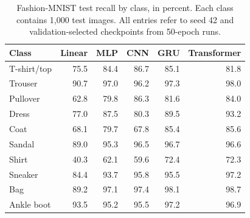 \begin{table}[htbp]
\centering\small
\caption{Fashion-MNIST test recall by class, in percent. Each class contains
1,000 test images. All entries refer to seed 42 and validation-selected checkpoints
from 50-epoch runs.}
\label{tab:class-recall}
\begin{tabular}{lrrrrr}
\toprule
Class & Linear & MLP & CNN & GRU & Transformer\\\midrule
T-shirt/top & 75.5 & 84.4 & 86.7 & 85.1 & 81.8\\
Trouser & 90.7 & 97.0 & 96.2 & 97.3 & 98.0\\
Pullover & 62.8 & 79.8 & 86.3 & 81.6 & 84.0\\
Dress & 77.0 & 87.5 & 80.3 & 89.5 & 93.2\\
Coat & 68.1 & 79.7 & 67.8 & 85.4 & 85.6\\
Sandal & 89.0 & 95.3 & 96.5 & 96.7 & 96.6\\
Shirt & 40.3 & 62.1 & 59.6 & 72.4 & 72.3\\
Sneaker & 84.4 & 93.7 & 95.8 & 95.5 & 97.2\\
Bag & 89.2 & 97.1 & 97.4 & 98.1 & 98.7\\
Ankle boot & 93.5 & 95.2 & 95.5 & 97.2 & 96.9\\
\bottomrule
\end{tabular}
\end{table}
